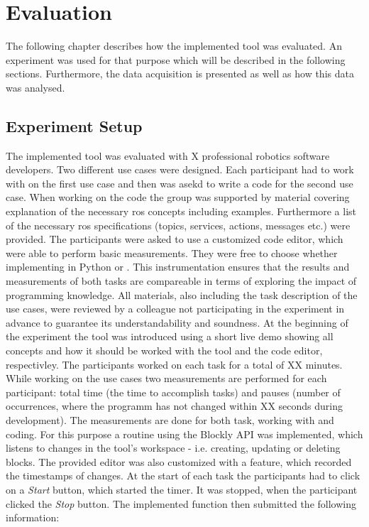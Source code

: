 \chapter{Evaluation}
The following chapter describes how the implemented tool was evaluated. An experiment was used for that purpose which will be described in the following sections. Furthermore, the data acquisition is presented as well as how this data was analysed.

\section{Experiment Setup} \label{sec:ExperimentSetup}
The implemented tool was evaluated with X professional robotics software developers. Two different use cases were designed. Each participant had to work with \toolname{} on the first use case and then was asekd to write a code for the second use case. When working on the code the group was supported by material covering explanation of the necessary \gls{ros} concepts including examples. Furthermore a list of the necessary \gls{ros} specifications (topics, services, actions, messages etc.) were provided. The participants were asked to use a customized code editor, which were able to perform basic measurements. They were free to choose whether implementing in Python or \Cpp{}. This instrumentation ensures that the results and measurements of both tasks are compareable in terms of exploring the impact of programming knowledge. All materials, also including the task description of the use cases, were reviewed by a colleague not participating in the experiment in advance to guarantee its understandability and soundness. At the beginning of the experiment the tool was introduced using a short live demo showing all concepts and how it should be worked with the tool and the code editor, respectivley. The participants worked on each task for a total of XX minutes. \\

While working on the use cases two measurements are performed for each participant: total time (the time to accomplish tasks) and pauses (number of occurrences, where the programm has not changed within XX seconds during development). The measurements are done for both task, working with \toolname{} and coding. For this purpose a routine using the Blockly API was implemented, which listens to changes in the tool's workspace - i.e. creating, updating or deleting blocks. The provided editor was also customized with a feature, which recorded the timestamps of changes. At the start of each task the participants had to click on a \textit{Start} button, which started the timer. It was stopped, when the participant clicked the \textit{Stop} button. The implemented function then submitted the following information:

